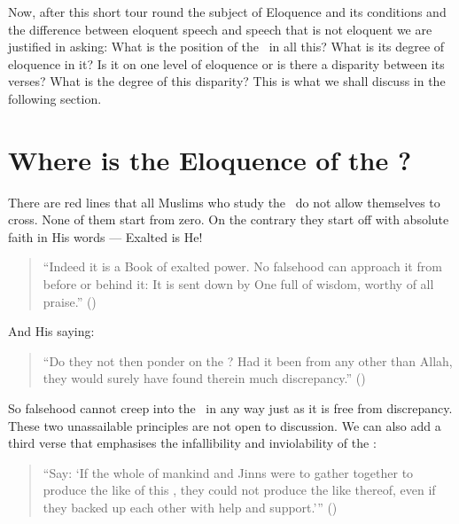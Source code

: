 \documentclass[12pt]{memoir}
\renewcommand\pardivider{\centerline{\ar{۞۞۞}}}
\begin{document}
\pardivider

Now, after this short tour round the subject of Eloquence and its conditions
and the difference between eloquent speech and speech
that is not eloquent we are justified in asking:
What is the position of the \Quran\ in all this?
What is its degree of eloquence in it?
Is it on one level of eloquence or is there a disparity between its verses?
What is the degree of this disparity?
This is what we shall discuss in the following section.

\section{Where is the Eloquence of the \Quran?}

There are red lines that all Muslims who study the \Quran\
do not allow themselves to cross.
None of them start from zero.
On the contrary they start off with absolute faith in His words —
Exalted is He!

\begin{quote}
“Indeed it is a Book of exalted power.
No falsehood can approach it from before or behind it:
It is sent down by One full of wisdom, worthy of all praise.”
()
\end{quote}

And His saying:

\begin{quote}
“Do they not then ponder on the \Quran?
Had it been from any other than Allah,
they would surely have found therein much discrepancy.” ()
\end{quote}

So falsehood cannot creep into the \Quran\ in any way
just as it is free from discrepancy.
These two unassailable principles are not open to discussion.
We can also add a third verse that emphasises the infallibility
and inviolability of the \Quran:

\begin{quote}
“Say: ‘If the whole of mankind and Jinns were to gather together
to produce the like of this \Quran, they could not produce the like thereof,
even if they backed up each other with help and support.’” (\QRef{17:88})
\end{quote}
\end{document}
